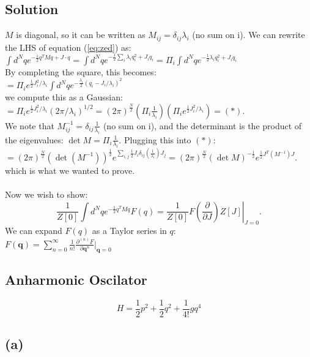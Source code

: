 \documentclass{article}
\begin{document}
\subsection*{Solution}
$M$ is diagonal, so it can be written as $M_{ij}=\delta_{ij}\lambda_i$ (no sum on i). We can rewrite the LHS of equation (\ref{eq:zed}) as:\\
$\int d^N q e^{-\frac{1}{2} q^T M q+J \cdot q}=\int d^N q e^{-\frac{1}{2} \sum_i \lambda_i q_i^2+J_iq_i}= \Pi_i \int d^N q e^{-\frac{1}{2} \lambda_i q_i^2+J_iq_i}$\\
By completing the square, this becomes:\\
$=\Pi_i e^{\frac{1}{2}J^2_i/\lambda_i}\int d^N q e^{-\frac{\lambda_i}{2}(q_i-J_i/\lambda_i)^2}$\\
we compute this as a Gaussian:\\
$=\Pi_i e^{\frac{1}{2}J^2_i/\lambda_i}(2\pi/\lambda_i)^{1/2}=(2\pi)^{\frac{N}{2}}(\Pi_i \frac{1}{\lambda_i})(\Pi_i e^{\frac{1}{2}J^2_i/\lambda_i})=(*)$. \\
We note that $M^{-1}_{ij}=\delta_{ij}\frac{1}{\lambda_i}$ (no sum on i), and the determinant is the product of the eigenvalues: $\det M =\Pi_i \frac{1}{\lambda_i}$. Plugging this into $(*)$:\\
$=(2\pi)^{\frac{N}{2}}(\det (M^{-1}))^{\frac{1}{2}}e^{\sum_{i,j} \frac{1}{2}J_i\delta_{ij}(\frac{1}{\lambda_i})J_j}=$$(2\pi)^{\frac{N}{2}}(\det M)^{-\frac{1}{2}}e^{ \frac{1}{2}J^T(M^{-1})J}$.\\
which is what we wanted to prove.\\\\
Now we wish to show:\\
\begin{equation}
\frac{1}{Z[0]} \int d^N q e^{-\frac{1}{2} q^T M q} F(q)=\left.\frac{1}{Z[0]} F\left(\frac{\partial}{\partial J}\right) Z[J]\right|_{J=0} .
\end{equation}
We can expand $F(q)$ as a Taylor series in $q$:\\
$F(\mathbf{q})=\sum_{n=0}^{\infty} \frac{1}{n!}\frac{\partial^{(n)}F}{\partial \mathbf{q}^n}|_{\mathbf{q}=0}$
\subsection*{Anharmonic Oscilator}
\begin{equation*}
    H=\frac{1}{2}p^2+\frac{1}{2}q^2+\frac{1}{4!}gq^4
\end{equation*}
\subsection*{(a)}
\end{document}
